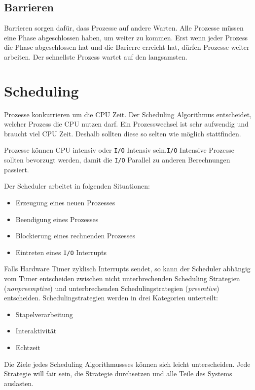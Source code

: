 \subsection{Barrieren}

Barrieren sorgen dafür, dass Prozesse auf andere Warten. Alle Prozesse müssen
eine Phase abgeschlossen haben, um weiter zu kommen. Erst wenn jeder Prozess
die Phase abgeschlossen hat und die Barierre erreicht hat, dürfen Prozesse
weiter arbeiten. Der schnellste Prozess wartet auf den langsamsten.

\section{Scheduling}

Prozesse konkurrieren um die CPU Zeit. Der Scheduling Algorithmus entscheidet,
welcher Prozess die CPU nutzen darf. Ein Prozesswechsel ist sehr aufwendig und
braucht viel CPU Zeit. Deshalb sollten diese so selten wie möglich stattfinden.

Prozesse können CPU intensiv oder \texttt{I/O} Intensiv sein.\texttt{I/O}
Intensive Prozesse sollten bevorzugt werden, damit die \texttt{I/O} Parallel zu
anderen Berechnungen passiert.

Der Scheduler arbeitet in folgenden Situationen:

\begin{itemize}
    \item Erzeugung eines neuen Prozesses
    \item Beendigung eines Prozesses
    \item Blockierung eines rechnenden Prozesses
    \item Eintreten eines \texttt{I/O} Interrupts
\end{itemize}

Falls Hardware Timer zyklisch Interrupts sendet, so kann der Scheduler abhängig
vom Timer entscheiden zwischen nicht unterbrechenden Scheduling Strategien
(\textit{nonpreemptive}) und unterbrechenden Schedulingstrategien
(\textit{preemtive}) entscheiden. Schedulingstrategien werden in drei
Kategorien unterteilt:

\begin{itemize}
    \item Stapelverarbeitung
    \item Interaktivität
    \item Echtzeit
\end{itemize}

Die Ziele jedes Scheduling Algorithmussses können sich leicht unterscheiden.
Jede Strategie will fair sein, die Strategie durchsetzen und alle Teile des
Systems auslasten.

